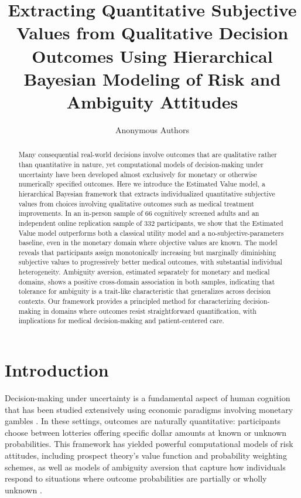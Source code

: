 \documentclass[12pt]{article}
\title{Extracting Quantitative Subjective Values from Qualitative Decision Outcomes Using Hierarchical Bayesian Modeling of Risk and Ambiguity Attitudes}
\author{Anonymous Authors}
\date{}
\begin{document}
\maketitle

\begin{abstract}
Many consequential real-world decisions involve outcomes that are qualitative rather than quantitative in nature, yet computational models of decision-making under uncertainty have been developed almost exclusively for monetary or otherwise numerically specified outcomes. Here we introduce the Estimated Value model, a hierarchical Bayesian framework that extracts individualized quantitative subjective values from choices involving qualitative outcomes such as medical treatment improvements. In an in-person sample of 66 cognitively screened adults and an independent online replication sample of 332 participants, we show that the Estimated Value model outperforms both a classical utility model and a no-subjective-parameters baseline, even in the monetary domain where objective values are known. The model reveals that participants assign monotonically increasing but marginally diminishing subjective values to progressively better medical outcomes, with substantial individual heterogeneity. Ambiguity aversion, estimated separately for monetary and medical domains, shows a positive cross-domain association in both samples, indicating that tolerance for ambiguity is a trait-like characteristic that generalizes across decision contexts. Our framework provides a principled method for characterizing decision-making in domains where outcomes resist straightforward quantification, with implications for medical decision-making and patient-centered care.
\end{abstract}

\section{Introduction}

Decision-making under uncertainty is a fundamental aspect of human cognition that has been studied extensively using economic paradigms involving monetary gambles \citep{kahneman1979prospect, tversky1992advances}. In these settings, outcomes are naturally quantitative: participants choose between lotteries offering specific dollar amounts at known or unknown probabilities. This framework has yielded powerful computational models of risk attitudes, including prospect theory's value function and probability weighting schemes, as well as models of ambiguity aversion that capture how individuals respond to situations where outcome probabilities are partially or wholly unknown \citep{ellsberg1961risk, gilboa1989maxmin}.
\end{document}
